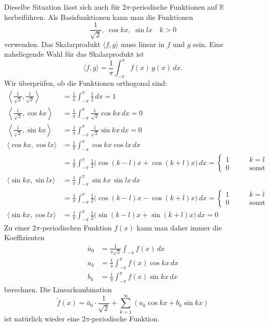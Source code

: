 Dieselbe Situation lässt sich auch für $2\pi$-periodische Funktionen 
auf $\mathbb R$ herbeiführen.
Als Basisfunktionen kann man die Funktionen 
\begin{equation}
\frac{1}{\sqrt{2}},\; \cos kx,\; \sin lx\quad k>0
\label{fourier:basis}
\end{equation}
verwenden.
Das Skalarprodukt $\langle f,g\rangle$ muss linear in $f$ und $g$ sein.
Eine naheliegende Wahl für das Skalarprodukt ist
\[
\langle f, g\rangle
=
\frac{1}{\pi}\int_{-\pi}^{\pi} f(x)\,g(x)\,dx.
\]
Wir überprüfen, ob die Funktionen orthogonal sind:
\begin{align*}
\left\langle \frac1{\sqrt{2}},\frac1{\sqrt{2}}\right\rangle
&=
\frac1{\pi}
\int_{-\pi}^{\pi} \frac12\,dx
=
1
\\
\left\langle \frac1{\sqrt{2}},\cos kx\right\rangle
&=
\frac1{\pi}\int_{-\pi}^{\pi}
\frac1{\sqrt{2}}\cos kx
\,dx
=0
\\
\left\langle \frac1{\sqrt{2}},\sin kx\right\rangle
&=
\frac1{\pi}\int_{-\pi}^{\pi}
\frac1{\sqrt{2}}\sin kx
\,dx
=0
\\
\langle \cos kx,\cos lx\rangle
&=
\frac1{\pi}
\int_{-\pi}^\pi \cos kx\cos lx\,dx
\\
&=
\frac1{\pi}
\int_{-\pi}^\pi
\frac12\bigl(
\cos (k-l)x+\cos (k+l)x
\bigr)
\,dx
=
\begin{cases}
1&\qquad k=l\\
0&\qquad\text{sonst}
\end{cases}
\\
\langle \sin kx,\sin lx\rangle
&=
\frac1{\pi}
\int_{-\pi}^\pi \sin kx\,\sin lx\,dx
\\
&=
\frac1{\pi}
\int_{-\pi}^\pi
\frac12
\bigl(
\cos (k-l)x - \cos (k+l)x
\bigr)
\,dx
=
\begin{cases}
1&\qquad k=l\\
0&\qquad\text{sonst}
\end{cases}
\\
\langle \sin kx,\cos lx\rangle
&=
\frac1{\pi}
\int_{-\pi}^{\pi} 
\frac12\bigl(
\sin (k-l)x + \sin (k+l)x
\bigr)
\,dx
=0
\end{align*}
Zu einer $2\pi$-periodischen Funktion $f(x)$ kann man daher immer
die Koeffizienten
\begin{equation}
\begin{aligned}
\bar{a}_0&=\frac1{\pi\sqrt{2}}\int_{-\pi}f(x)\,dx
\\
a_k&=\frac1{\pi}\int_{-\pi}^\pi f(x)\cos kx\,dx
\\
b_k&=\frac1{\pi}\int_{-\pi}^\pi f(x)\sin kx\,dx
\end{aligned}
\label{fourier:normalekoeffizienten}
\end{equation}
berechnen.
Die Linearkombination
\begin{equation}
\tilde f(x)
=
\bar{a}_0\cdot\frac1{\sqrt{2}}
+ 
\sum_{k=1}^\infty (a_k\cos kx+b_k\sin kx)
\label{fourier:reihe}
\end{equation}
ist natürlich wieder eine $2\pi$-periodische Funktion.


